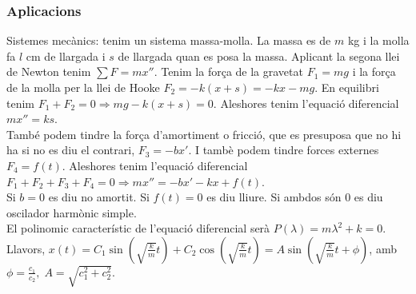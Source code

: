 \documentclass[../main.tex]{subfiles}
\begin{document}
\subsubsection{Aplicacions}
Sistemes mecànics: tenim un sistema massa-molla. La massa es de $m$ kg i la molla fa $l$ cm de llargada i $s$ de llargada quan es posa la massa. Aplicant la segona llei de Newton tenim $\sum F = mx''$. Tenim la força de la gravetat $F_1 = mg$ i la força de la molla per la llei de Hooke $F_2 = -k(x+s) = -kx-mg$. En equilibri tenim $F_1 + F_2 = 0 \Rightarrow mg - k(x+s) = 0$. Aleshores tenim l'equació diferencial $mx'' = ks$.\\
També podem tindre la força d'amortiment o fricció, que es presuposa que no hi ha si no es diu el contrari, $F_3 = -bx'$. I tambè podem tindre forces externes $F_4 = f(t)$. Aleshores tenim l'equació diferencial $F_1 + F_2 + F_3 + F_4 = 0 \Rightarrow mx'' = -bx' - kx + f(t)$.\\
Si $b = 0$ es diu no amortit. Si $f(t) = 0$ es diu lliure. Si ambdos són $0$ es diu oscilador harmònic simple.\\
El polinomic característic de l'equació diferencial serà $P(\lambda) = m\lambda^2 + k = 0$. Llavors, $x(t) = C_1\sin(\sqrt{\frac{k}{m}}t) + C_2\cos(\sqrt{\frac{k}{m}}t) = A\sin(\sqrt{\frac{k}{m}}t + \phi)$, amb $\phi = \frac{c_1}{c_2},\;A=\sqrt{c_1^2+c_2^2}$.\\
\end{document}
